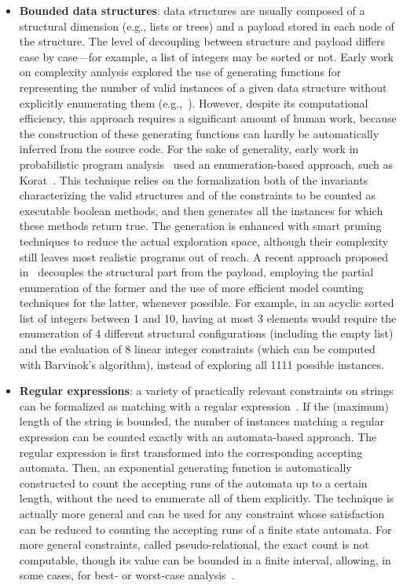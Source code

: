 \begin{itemize}
	\item \textbf{Bounded data structures}: data structures are usually composed of a structural dimension (e.g., lists or trees) and a payload stored in each node of the structure. The level of decoupling between structure and payload differs case by case---for example, a list of integers may be sorted or not. Early work on complexity analysis explored the use of generating functions for representing the number of valid instances of a given data structure without explicitly enumerating them (e.g.,~\cite{flajolet1985mathematical}). However, despite its computational efficiency, this approach requires a significant amount of human work, because the construction of these generating functions can hardly be automatically inferred from the source code. For the sake of generality, early work in probabilistic program analysis~\cite{Filieri2013} used an enumeration-based approach, such as Korat~\cite{Korat2002}. This technique relies on the formalization both of the invariants characterizing the valid structures and of the constraints to be counted as executable boolean methods, and then generates all the instances for which these methods return true. The generation is enhanced with smart pruning techniques to reduce the actual exploration space, although their complexity still leaves most realistic programs out of reach. A recent approach proposed in~\cite{Filieri2015} decouples the structural part from the payload, employing the partial enumeration of the former and the use of more efficient model counting techniques for the latter, whenever possible. For example, in an acyclic sorted list of integers between 1 and 10, having at most 3 elements would require the enumeration of 4 different structural configurations (including the empty list) and the evaluation of 8 linear integer constraints (which can be computed with Barvinok's algorithm), instead of exploring all 1111 possible instances.

	\item \textbf{Regular expressions}: a variety of practically relevant constraints on strings can be formalized as matching with a regular expression~\cite{Luu2014,Aydin2015}. If the (maximum) length of the string is bounded, the number of instances matching a regular expression can be counted exactly with an automata-based approach. The regular expression is first transformed into the corresponding accepting automata. Then, an exponential generating function is automatically constructed to count the accepting runs of the automata up to a certain length, without the need to enumerate all of them explicitly. The technique is actually more general and can be used for any constraint whose satisfaction can be reduced to counting the accepting runs of a finite state automata. For more general constraints, called pseudo-relational, the exact count is not computable, though its value can be bounded in a finite interval, allowing, in some cases, for best- or worst-case analysis~\cite{Aydin2015}.
	

\end{itemize}
